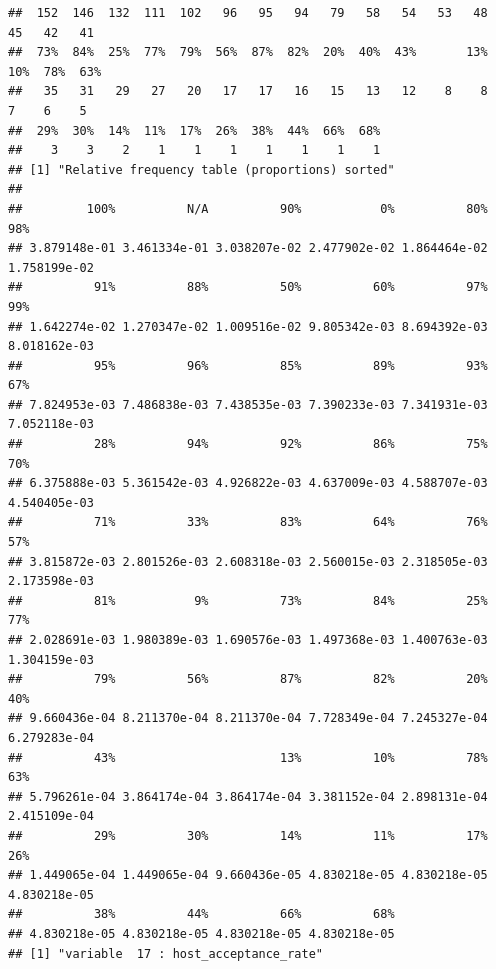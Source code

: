 \begin{verbatim}
##  152  146  132  111  102   96   95   94   79   58   54   53   48   45   42   41 
##  73%  84%  25%  77%  79%  56%  87%  82%  20%  40%  43%       13%  10%  78%  63% 
##   35   31   29   27   20   17   17   16   15   13   12    8    8    7    6    5 
##  29%  30%  14%  11%  17%  26%  38%  44%  66%  68% 
##    3    3    2    1    1    1    1    1    1    1 
## [1] "Relative frequency table (proportions) sorted"
## 
##         100%          N/A          90%           0%          80%          98% 
## 3.879148e-01 3.461334e-01 3.038207e-02 2.477902e-02 1.864464e-02 1.758199e-02 
##          91%          88%          50%          60%          97%          99% 
## 1.642274e-02 1.270347e-02 1.009516e-02 9.805342e-03 8.694392e-03 8.018162e-03 
##          95%          96%          85%          89%          93%          67% 
## 7.824953e-03 7.486838e-03 7.438535e-03 7.390233e-03 7.341931e-03 7.052118e-03 
##          28%          94%          92%          86%          75%          70% 
## 6.375888e-03 5.361542e-03 4.926822e-03 4.637009e-03 4.588707e-03 4.540405e-03 
##          71%          33%          83%          64%          76%          57% 
## 3.815872e-03 2.801526e-03 2.608318e-03 2.560015e-03 2.318505e-03 2.173598e-03 
##          81%           9%          73%          84%          25%          77% 
## 2.028691e-03 1.980389e-03 1.690576e-03 1.497368e-03 1.400763e-03 1.304159e-03 
##          79%          56%          87%          82%          20%          40% 
## 9.660436e-04 8.211370e-04 8.211370e-04 7.728349e-04 7.245327e-04 6.279283e-04 
##          43%                       13%          10%          78%          63% 
## 5.796261e-04 3.864174e-04 3.864174e-04 3.381152e-04 2.898131e-04 2.415109e-04 
##          29%          30%          14%          11%          17%          26% 
## 1.449065e-04 1.449065e-04 9.660436e-05 4.830218e-05 4.830218e-05 4.830218e-05 
##          38%          44%          66%          68% 
## 4.830218e-05 4.830218e-05 4.830218e-05 4.830218e-05 
## [1] "variable  17 : host_acceptance_rate"
\end{verbatim}

